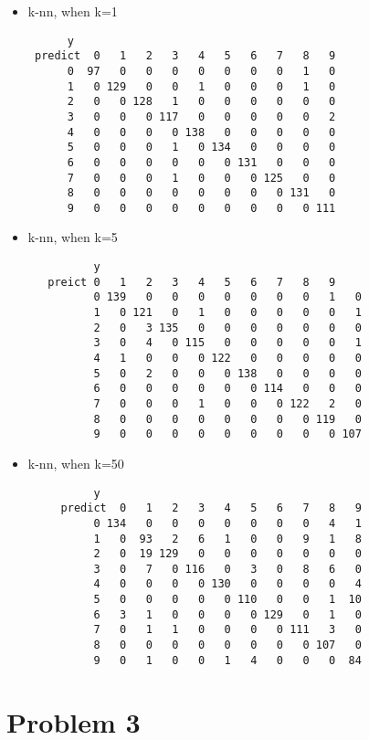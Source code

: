 \documentclass{article}
\begin{document}
\begin{itemize}
	\item k-nn, when k=1\\
	\begin{verbatim}
      y
 predict  0   1   2   3   4   5   6   7   8   9
      0  97   0   0   0   0   0   0   0   1   0
      1   0 129   0   0   1   0   0   0   1   0
      2   0   0 128   1   0   0   0   0   0   0
      3   0   0   0 117   0   0   0   0   0   2
      4   0   0   0   0 138   0   0   0   0   0
      5   0   0   0   1   0 134   0   0   0   0
      6   0   0   0   0   0   0 131   0   0   0
      7   0   0   0   1   0   0   0 125   0   0
      8   0   0   0   0   0   0   0   0 131   0
      9   0   0   0   0   0   0   0   0   0 111
	\end{verbatim}
	
	\item k-nn, when k=5
	\begin{verbatim}
	      y
   preict 0   1   2   3   4   5   6   7   8   9
	      0 139   0   0   0   0   0   0   0   1   0
	      1   0 121   0   1   0   0   0   0   0   1
	      2   0   3 135   0   0   0   0   0   0   0
	      3   0   4   0 115   0   0   0   0   0   1
	      4   1   0   0   0 122   0   0   0   0   0
	      5   0   2   0   0   0 138   0   0   0   0
	      6   0   0   0   0   0   0 114   0   0   0
	      7   0   0   0   1   0   0   0 122   2   0
	      8   0   0   0   0   0   0   0   0 119   0
	      9   0   0   0   0   0   0   0   0   0 107
	\end{verbatim}
	
	\item k-nn, when k=50
	\begin{verbatim}
	      y
	 predict  0   1   2   3   4   5   6   7   8   9
	      0 134   0   0   0   0   0   0   0   4   1
	      1   0  93   2   6   1   0   0   9   1   8
	      2   0  19 129   0   0   0   0   0   0   0
	      3   0   7   0 116   0   3   0   8   6   0
	      4   0   0   0   0 130   0   0   0   0   4
	      5   0   0   0   0   0 110   0   0   1  10
	      6   3   1   0   0   0   0 129   0   1   0
	      7   0   1   1   0   0   0   0 111   3   0
	      8   0   0   0   0   0   0   0   0 107   0
	      9   0   1   0   0   1   4   0   0   0  84
	\end{verbatim}
\end{itemize}

\section{Problem 3}
 \begin{figure}[H]
 	\centering

 	\caption{}
 	\label{fig:pattern1}
 \end{figure}
 
\end{document}
